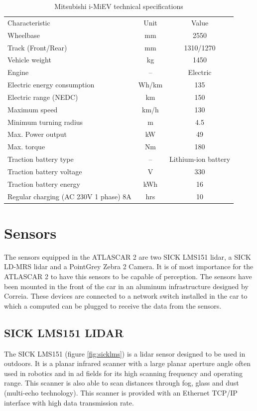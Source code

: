 \begin{table}[!h]
	\centering
	\caption{Mitsubishi i-MiEV technical specifications}
	\label{tab: MiEV technical}
	\begin{tabular}{lcc}
		Characteristic & Unit & Value\\
		Wheelbase & mm & 2550\\
		Track (Front/Rear) & mm & 1310/1270 \\
		Vehicle weight & kg  & 1450 \\
		\hline
		Engine & -- & Electric \\
		Electric energy consumption & Wh/km & 135 \\
		Electric range (NEDC)  & km & 150 \\
		Maximum speed & km/h & 130 \\
		Minimum turning radius & m & 4.5 \\
		Max. Power output & kW & 49 \\
		Max. torque & Nm & 180 \\
		\hline
		Traction battery type & -- & Lithium-ion battery \\
		Traction battery voltage & V & 330 \\
		Traction battery energy & kWh & 16 \\
		Regular charging (AC 230V 1 phase) 8A & hrs & 10 \\
	\end{tabular}
\end{table}

\section{Sensors}

The sensors equipped in the ATLASCAR 2 are two SICK LMS151 \gls{lidar}, a SICK LD-MRS \gls{lidar} and a PointGrey Zebra 2 Camera. It is of most importance for the ATLASCAR 2 to have this sensors to be capable of perception. The sensors have been mounted in the front of the car in an aluminum infrastructure designed by Correia. \cite{Correia2017} These devices are connected to a network switch installed in the car to which a computed can be plugged to receive the data from the sensors.

\subsection{SICK LMS151 LIDAR}

The SICK LMS151 (figure \ref{fig:sicklms}) is a \gls{lidar} sensor designed to be used in outdoors. It is a planar infrared scanner with a large planar aperture angle often used in robotics and in \gls{ad} fields for its high scanning frequency and operating range. This scanner is also able to scan distances through fog, glass and dust (multi-echo technology). This scanner is provided with an Ethernet TCP/IP interface with high data transmission rate. \cite{SICK}


